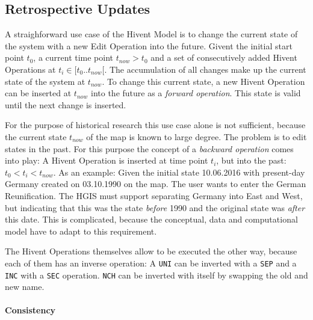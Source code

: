 
\subsection{Retrospective Updates} %
\label{sub:retrospective_updates}

A straighforward use case of the Hivent Model is to change the current state of the system with a new Edit Operation into the future. Givent the initial start point $t_0$, a current time point $t_{now} > t_0$ and a set of consecutively added Hivent Operations at $t_i \in [t_0 .. t_{now}[$. The accumulation of all changes make up the current state of the system at $t_{now}$. To change this current state, a new Hivent Operation can be inserted at $t_{now}$ into the future as a \emph{forward operation}. This state is valid until the next change is inserted.

For the purpose of historical research this use case alone is not sufficient, because the current state $t_{now}$ of the map is known to large degree. The problem is to edit states in the past. For this purpose the concept of a \emph{backward operation} comes into play: A Hivent Operation is inserted at time point $t_i$, but into the past: $ t_0 < t_i < t_{now}$. As an example: Given the initial state 10.06.2016 with present-day Germany created on 03.10.1990 on the map. The user wants to enter the German Reunification. The HGIS must support separating Germany into East and West, but indicating that this was the state \emph{before} 1990 and the original state was \emph{after} this date. This is complicated, because the conceptual, data and computational model have to adapt to this requirement.

The Hivent Operations themselves allow to be executed the other way, because each of them has an inverse operation: A \texttt{UNI} can be inverted with a \texttt{SEP} and a \texttt{INC} with a \texttt{SEC} operation. \texttt{NCH} can be inverted with itself by swapping the old and new name.

\paragraph{Consistency} %
\label{par:consistency}

